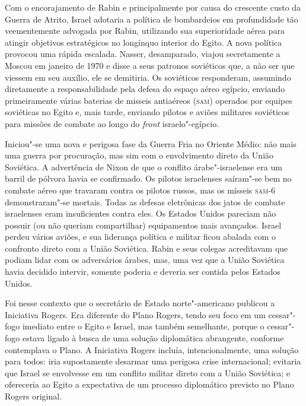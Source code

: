 Com o encorajamento de Rabin e principalmente por causa do crescente
custo da Guerra de Atrito, Israel adotaria a política de bombardeios em
profundidade tão veementemente advogada por Rabin, utilizando sua
superioridade aérea para atingir objetivos estratégicos no longínquo
interior do Egito. A nova política provocou uma rápida escalada. Nasser,
desamparado, viajou secretamente a Moscou em janeiro de 1970 e disse a
seus patronos soviéticos que, a não ser que viessem em seu auxílio, ele
se demitiria. Os soviéticos responderam, assumindo diretamente a
responsabilidade pela defesa do espaço aéreo egípcio, enviando
primeiramente várias baterias de misseis antiaéreos (\textsc{sam}) operados por
equipes soviéticas no Egito e, mais tarde, enviando pilotos e aviões
militares soviéticos para missões de combate ao longo do \emph{front}
israelo"-egípcio.

Iniciou"-se uma nova e perigosa fase da Guerra Fria no Oriente Médio: não
mais uma guerra por procuração, mas sim com o envolvimento direto da
União Soviética. A advertência de Nixon de que o conflito
árabe"-israelense era um barril de pólvora havia se confirmado. Os
pilotos israelenses saíram"-se bem no combate aéreo que travaram contra
os pilotos russos, mas os mísseis \textsc{sam}-6 demonstraram"-se mortais. Todas
as defesas eletrônicas dos jatos de combate israelenses eram
insuficientes contra eles. Os Estados Unidos pareciam não possuir (ou
não queriam compartilhar) equipamentos mais avançados. Israel perdeu
vários aviões, e sua liderança política e militar ficou abalada com o
confronto direto com a União Soviética. Rabin e seus colegas acreditavam
que podiam lidar com os adversários árabes, mas, uma vez que a União
Soviética havia decidido intervir, somente poderia e deveria ser contida
pelos Estados Unidos.

Foi nesse contexto que o secretário de Estado norte"-americano publicou a
Iniciativa Rogers. Era diferente do Plano Rogers, tendo seu foco em um
cessar"-fogo imediato entre o Egito e Israel, mas também semelhante, porque o
cessar"-fogo estava ligado à busca de uma solução diplomática abrangente,
conforme contemplava o Plano. A Iniciativa Rogers incluía,
intencionalmente, uma solução para todos: iria supostamente desarmar uma
perigosa crise internacional; evitaria que Israel se envolvesse em um
conflito militar direto com a União Soviética; e ofereceria ao Egito a
expectativa de um processo diplomático previsto no Plano Rogers
original.

